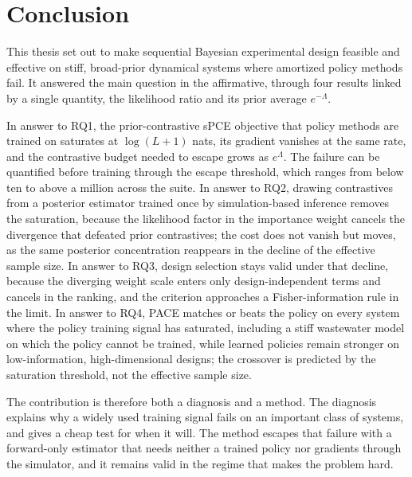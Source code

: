 \chapter{Conclusion}
\label{sec:conclusion}

This thesis set out to make sequential Bayesian experimental design feasible and
effective on stiff, broad-prior dynamical systems where amortized policy methods
fail. It answered the main question in the affirmative, through four results linked
by a single quantity, the likelihood ratio and its prior average $e^{-\Lambda}$.

In answer to RQ1, the prior-contrastive sPCE objective that policy methods are
trained on saturates at $\log(L+1)$ nats, its gradient vanishes at the same rate,
and the contrastive budget needed to escape grows as $e^{\Lambda}$. The failure can
be quantified before training through the escape threshold, which ranges from below
ten to above a million across the suite. In answer to RQ2, drawing contrastives
from a posterior estimator trained once by simulation-based inference removes the
saturation, because the likelihood factor in the importance weight cancels the
divergence that defeated prior contrastives; the cost does not vanish but moves, as
the same posterior concentration reappears in the decline of the effective sample
size. In answer to RQ3, design selection stays valid under that decline, because
the diverging weight scale enters only design-independent terms and cancels in the
ranking, and the criterion approaches a Fisher-information rule in the limit. In
answer to RQ4, PACE matches or beats the policy on every system where the policy
training signal has saturated, including a stiff wastewater model on which the
policy cannot be trained, while learned policies remain stronger on low-information,
high-dimensional designs; the crossover is predicted by the saturation threshold,
not the effective sample size.

The contribution is therefore both a diagnosis and a method. The diagnosis explains
why a widely used training signal fails on an important class of systems, and gives
a cheap test for when it will. The method escapes that failure with a forward-only
estimator that needs neither a trained policy nor gradients through the simulator,
and it remains valid in the regime that makes the problem hard.

